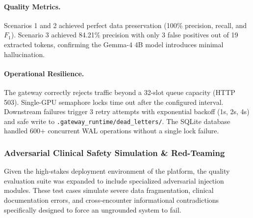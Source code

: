 \paragraph{Quality Metrics.}
Scenarios 1 and 2 achieved perfect data preservation (100\% precision, recall, and $F_1$). Scenario 3 achieved 84.21\% precision with only 3 false positives out of 19 extracted tokens, confirming the Gemma-4 4B model introduces minimal hallucination.

\paragraph{Operational Resilience.}
The gateway correctly rejects traffic beyond a 32-slot queue capacity (HTTP 503). Single-GPU semaphore locks time out after the configured interval. Downstream failures trigger 3 retry attempts with exponential backoff (1s, 2s, 4s) and safe write to \texttt{.gateway\_runtime/dead\_letters/}. The SQLite database handled 600+ concurrent WAL operations without a single lock failure.

\subsubsection{Adversarial Clinical Safety Simulation \& Red-Teaming}
Given the high-stakes deployment environment of the platform, the quality evaluation suite was expanded to include specialized adversarial injection modules. These test cases simulate severe data fragmentation, clinical documentation errors, and cross-encounter informational contradictions specifically designed to force an ungrounded system to fail.


